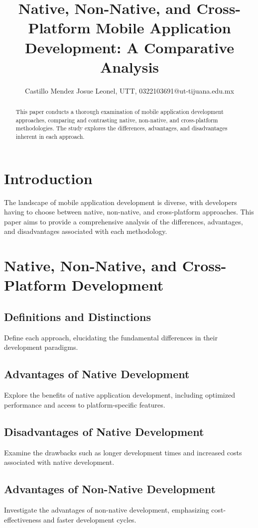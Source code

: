 \documentclass{article}
\title{Native, Non-Native, and Cross-Platform Mobile Application Development: A Comparative Analysis}
\author{Castillo Mendez Josue Leonel, UTT, 0322103691@ut-tijuana.edu.mx}
\date{}
\begin{document}
	
	\maketitle
	
	\begin{abstract}
		This paper conducts a thorough examination of mobile application development approaches, comparing and contrasting native, non-native, and cross-platform methodologies. The study explores the differences, advantages, and disadvantages inherent in each approach.
	\end{abstract}
	
	\section{Introduction}
	The landscape of mobile application development is diverse, with developers having to choose between native, non-native, and cross-platform approaches. This paper aims to provide a comprehensive analysis of the differences, advantages, and disadvantages associated with each methodology.
	
	\section{Native, Non-Native, and Cross-Platform Development}
	\subsection{Definitions and Distinctions}
	Define each approach, elucidating the fundamental differences in their development paradigms.
	
	\subsection{Advantages of Native Development}
	Explore the benefits of native application development, including optimized performance and access to platform-specific features.
	
	\subsection{Disadvantages of Native Development}
	Examine the drawbacks such as longer development times and increased costs associated with native development.
	
	\subsection{Advantages of Non-Native Development}
	Investigate the advantages of non-native development, emphasizing cost-effectiveness and faster development cycles.
	
\end{document}
